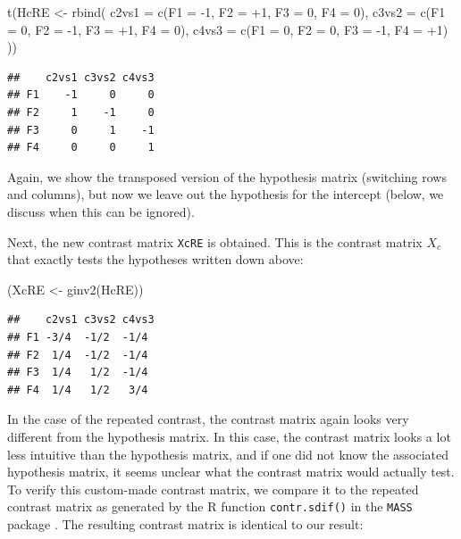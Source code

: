 \documentclass[
  12pt,
]{krantz}
\newenvironment{Shaded}{\begin{snugshade}}{\end{snugshade}}
\newcommand{\AttributeTok}[1]{\textcolor[rgb]{0.77,0.63,0.00}{#1}}
\newcommand{\DecValTok}[1]{\textcolor[rgb]{0.00,0.00,0.81}{#1}}
\newcommand{\FunctionTok}[1]{\textcolor[rgb]{0.00,0.00,0.00}{#1}}
\newcommand{\NormalTok}[1]{#1}
\newcommand{\OtherTok}[1]{\textcolor[rgb]{0.56,0.35,0.01}{#1}}
\newcommand{\SpecialCharTok}[1]{\textcolor[rgb]{0.00,0.00,0.00}{#1}}
\theoremstyle{definition}
\theoremstyle{definition}
\theoremstyle{definition}
\theoremstyle{definition}
\theoremstyle{remark}
\begin{document}
\begin{Shaded}
\begin{Highlighting}[]
\FunctionTok{t}\NormalTok{(HcRE }\OtherTok{\textless{}{-}} \FunctionTok{rbind}\NormalTok{(}
  \AttributeTok{c2vs1 =} \FunctionTok{c}\NormalTok{(}\AttributeTok{F1 =} \SpecialCharTok{{-}}\DecValTok{1}\NormalTok{, }\AttributeTok{F2 =} \SpecialCharTok{+}\DecValTok{1}\NormalTok{, }\AttributeTok{F3 =} \DecValTok{0}\NormalTok{, }\AttributeTok{F4 =} \DecValTok{0}\NormalTok{),}
  \AttributeTok{c3vs2 =} \FunctionTok{c}\NormalTok{(}\AttributeTok{F1 =} \DecValTok{0}\NormalTok{, }\AttributeTok{F2 =} \SpecialCharTok{{-}}\DecValTok{1}\NormalTok{, }\AttributeTok{F3 =} \SpecialCharTok{+}\DecValTok{1}\NormalTok{, }\AttributeTok{F4 =} \DecValTok{0}\NormalTok{),}
  \AttributeTok{c4vs3 =} \FunctionTok{c}\NormalTok{(}\AttributeTok{F1 =} \DecValTok{0}\NormalTok{, }\AttributeTok{F2 =} \DecValTok{0}\NormalTok{, }\AttributeTok{F3 =} \SpecialCharTok{{-}}\DecValTok{1}\NormalTok{, }\AttributeTok{F4 =} \SpecialCharTok{+}\DecValTok{1}\NormalTok{)}
\NormalTok{))}
\end{Highlighting}
\end{Shaded}

\begin{verbatim}
##    c2vs1 c3vs2 c4vs3
## F1    -1     0     0
## F2     1    -1     0
## F3     0     1    -1
## F4     0     0     1
\end{verbatim}

Again, we show the transposed version of the hypothesis matrix (switching rows and columns), but now we leave out the hypothesis for the intercept (below, we discuss when this can be ignored).

Next, the new contrast matrix \texttt{XcRE} is obtained. This is the contrast matrix \(X_c\) that exactly tests the hypotheses written down above:

\begin{Shaded}
\begin{Highlighting}[]
\NormalTok{(XcRE }\OtherTok{\textless{}{-}} \FunctionTok{ginv2}\NormalTok{(HcRE))}
\end{Highlighting}
\end{Shaded}

\begin{verbatim}
##    c2vs1 c3vs2 c4vs3
## F1 -3/4  -1/2  -1/4 
## F2  1/4  -1/2  -1/4 
## F3  1/4   1/2  -1/4 
## F4  1/4   1/2   3/4
\end{verbatim}

In the case of the repeated contrast, the contrast matrix again looks very different from the hypothesis matrix. In this case, the contrast matrix looks a lot less intuitive than the hypothesis matrix, and if one did not know the associated hypothesis matrix, it seems unclear what the contrast matrix would actually test. To verify this custom-made contrast matrix, we compare it to the repeated contrast matrix as generated by the R function \texttt{contr.sdif()} in the \texttt{MASS} package \citep{R-MASS}. The resulting contrast matrix is identical to our result:
\end{document}
